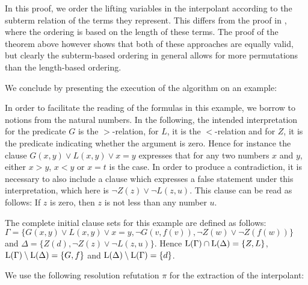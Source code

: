 \begin{remark}
	In this proof, we order the lifting variables in the interpolant according to the subterm relation of the terms they represent.
	This differs from the proof in \cite{Huang95}, where the ordering is based on the length of these terms.
	The proof of the theorem above however shows that both of these approaches are equally valid, but clearly the subterm-based ordering in general allows for more permutations than the length-based ordering. 
\end{remark}

We conclude by presenting the execution of the algorithm on an example:

\begin{exa}
	\label{exa:two_phase}
	In order to facilitate the reading of the formulas in this example, we borrow to notions from the natural numbers.
	In the following, 
	the intended interpretation for the predicate $G$ is the $>$-relation, for $L$, it is the $<$-relation and for $Z$, it is the predicate indicating whether the argument is zero.
	Hence for instance the clause $G(x, y) \lor L(x, y) \lor x = y$ expresses that for any two numbers $x$ and $y$, either $x>y$, $x<y$ or $x=t$ is the case.
	In order to produce a contradiction, it is necessary to also include a clause which expresses a false statement under this interpretation, which here is $\lnot Z(z) \lor \lnot L(z, u)$. 
	This clause can be read as follows: If $z$ is zero, then $z$ is not less than any number $u$.

	The complete initial clause sets for this example are defined as follows:
	$\Gamma = \{ G(x, y) \lor L(x, y) \lor x = y, \lnot G(v, f(v)), \lnot Z(w) \lor \lnot Z(f(w)) \}$
	and 
	$\Delta = \{ Z(d), \lnot Z(z) \lor \lnot L(z, u) \}$.
	Hence $\operatorname{L}(\Gamma)\cap \operatorname{L}(\Delta) = \{ Z, L \}$,
	$\operatorname{L}(\Gamma)\setminus \operatorname{L}(\Delta) = \{ G,  f \}$ and
	$\operatorname{L}(\Delta)\setminus \operatorname{L}(\Gamma) = \{ d \}$.

	We use the following resolution refutation $\pi$ for the extraction of the interpolant:
	\smallskip
	{ %

		
		\begin{adjustwidth}{6.2em}{0em}
			\def\defaultHypSeparation{\hskip 1.4em}
			\def\ScoreOverhang{-0em}
			\begin{prooftree}



\end{prooftree}
\end{adjustwidth}}
\end{exa}

